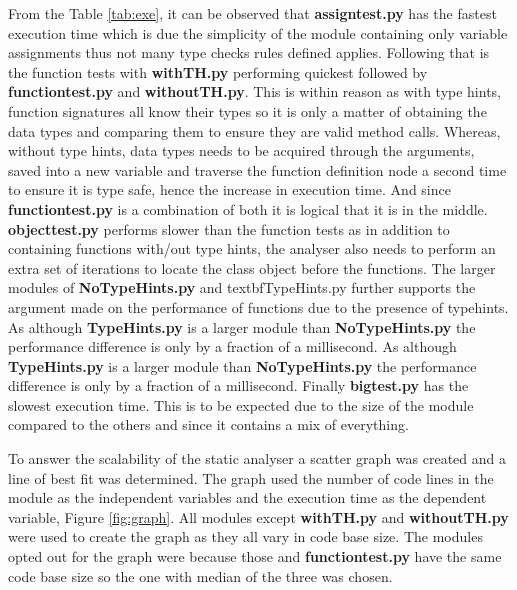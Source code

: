 \documentclass{l4proj}
\begin{document}
From the Table \ref{tab:exe}, it can be observed that \textbf{assign\textunderscore test.py} has the fastest execution time which is due the simplicity of the module containing only variable assignments thus not many type checks rules defined applies. Following that is the function tests with \textbf{withTH.py} performing quickest followed by \textbf{function\textunderscore test.py} and \textbf{withoutTH.py}. This is within reason as with type hints, function signatures all know their types so it is only a matter of obtaining the data types and comparing them to ensure they are valid method calls. Whereas, without type hints, data types needs to be acquired through the arguments, saved into a new variable and traverse the function definition node a second time to ensure it is type safe, hence the increase in execution time. And since \textbf{function\textunderscore test.py} is a combination of both it is logical that it is in the middle. \textbf{object\textunderscore test.py} performs slower than the function tests as in addition to containing functions with/out type hints, the analyser also needs to perform an extra set of iterations to locate the class object before the functions. The larger modules of \textbf{NoTypeHints.py} and textbf{TypeHints.py} further supports the argument made on the performance of functions due to the presence of typehints. As although \textbf{TypeHints.py} is a larger module than \textbf{NoTypeHints.py} the performance difference is only by a fraction of a millisecond. As although \textbf{TypeHints.py} is a larger module than \textbf{NoTypeHints.py} the performance difference is only by a fraction of a millisecond. Finally \textbf{big\textunderscore test.py} has the slowest execution time. This is to be expected due to the size of the module compared to the others and since it contains a mix of everything. 

To answer the scalability of the static analyser a scatter graph was created and a line of best fit was determined. The graph used the number of code lines in the module as the independent variables and the execution time as the dependent variable, Figure \ref{fig:graph}. All modules except \textbf{withTH.py} and \textbf{withoutTH.py} were used to create the graph as they all vary in code base size. The modules opted out for the graph were because those and \textbf{function\textunderscore test.py} have the same code base size so the one with median of the three was chosen.
\end{document}
